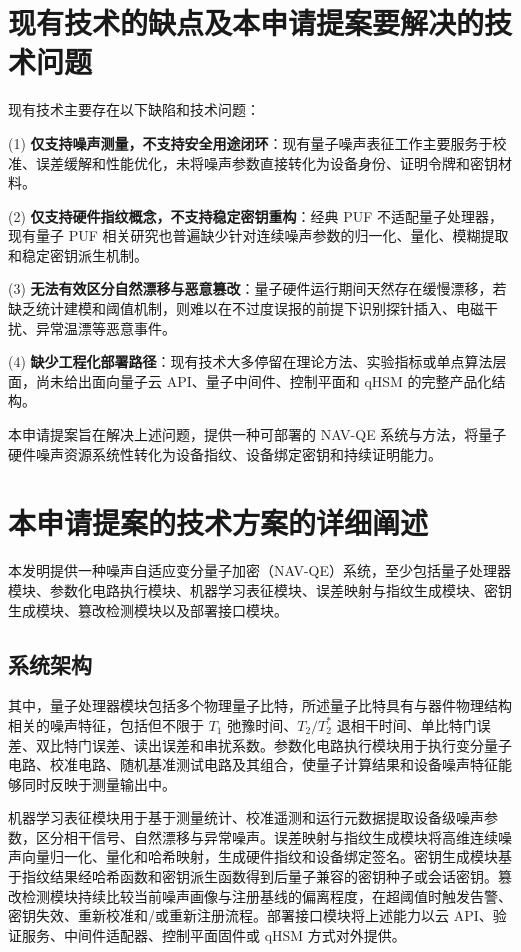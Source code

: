 \documentclass[12pt,a4paper]{article}
\begin{document}
\section{现有技术的缺点及本申请提案要解决的技术问题}

现有技术主要存在以下缺陷和技术问题：

(1) \textbf{仅支持噪声测量，不支持安全用途闭环}：现有量子噪声表征工作主要服务于校准、误差缓解和性能优化，未将噪声参数直接转化为设备身份、证明令牌和密钥材料。

(2) \textbf{仅支持硬件指纹概念，不支持稳定密钥重构}：经典 PUF 不适配量子处理器，现有量子 PUF 相关研究也普遍缺少针对连续噪声参数的归一化、量化、模糊提取和稳定密钥派生机制。

(3) \textbf{无法有效区分自然漂移与恶意篡改}：量子硬件运行期间天然存在缓慢漂移，若缺乏统计建模和阈值机制，则难以在不过度误报的前提下识别探针插入、电磁干扰、异常温漂等恶意事件。

(4) \textbf{缺少工程化部署路径}：现有技术大多停留在理论方法、实验指标或单点算法层面，尚未给出面向量子云 API、量子中间件、控制平面和 qHSM 的完整产品化结构。

本申请提案旨在解决上述问题，提供一种可部署的 NAV-QE 系统与方法，将量子硬件噪声资源系统性转化为设备指纹、设备绑定密钥和持续证明能力。

\section{本申请提案的技术方案的详细阐述}

本发明提供一种噪声自适应变分量子加密（NAV-QE）系统，至少包括量子处理器模块、参数化电路执行模块、机器学习表征模块、误差映射与指纹生成模块、密钥生成模块、篡改检测模块以及部署接口模块。

\subsection{系统架构}

其中，量子处理器模块包括多个物理量子比特，所述量子比特具有与器件物理结构相关的噪声特征，包括但不限于 $T_1$ 弛豫时间、$T_2/T_2^*$ 退相干时间、单比特门误差、双比特门误差、读出误差和串扰系数。参数化电路执行模块用于执行变分量子电路、校准电路、随机基准测试电路及其组合，使量子计算结果和设备噪声特征能够同时反映于测量输出中。

机器学习表征模块用于基于测量统计、校准遥测和运行元数据提取设备级噪声参数，区分相干信号、自然漂移与异常噪声。误差映射与指纹生成模块将高维连续噪声向量归一化、量化和哈希映射，生成硬件指纹和设备绑定签名。密钥生成模块基于指纹结果经哈希函数和密钥派生函数得到后量子兼容的密钥种子或会话密钥。篡改检测模块持续比较当前噪声画像与注册基线的偏离程度，在超阈值时触发告警、密钥失效、重新校准和/或重新注册流程。部署接口模块将上述能力以云 API、验证服务、中间件适配器、控制平面固件或 qHSM 方式对外提供。
\end{document}
